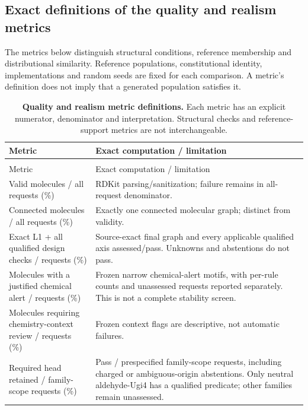 \subsection{Exact definitions of the quality and realism metrics}
\label{app:22-metrics}
The metrics below distinguish structural conditions, reference membership and distributional
similarity. Reference populations, constitutional identity, implementations and random seeds are fixed
for each comparison. A metric's definition does not imply that a generated population satisfies it.

\begingroup\footnotesize\setlength{\tabcolsep}{4pt}\renewcommand{\arraystretch}{1.12}
\begin{longtable}{@{}>{\raggedright\arraybackslash}p{}>{\raggedright\arraybackslash}p{}@{}}
\caption{\textbf{Quality and realism metric definitions.} Each metric has an explicit numerator, denominator and interpretation. Structural checks and reference-support
metrics are not interchangeable.}\label{tab:22-metric-definitions}\\
\toprule Metric & Exact computation / limitation\\\midrule\endfirsthead
\multicolumn{2}{l}{Table~\ref{tab:22-metric-definitions}, continued}\\\toprule
Metric & Exact computation / limitation\\\midrule\endhead
\bottomrule\endfoot
Valid molecules / all requests (\%) & RDKit parsing/sanitization; failure remains in all-request denominator. \\[1.5pt]
Connected molecules / all requests (\%) & Exactly one connected molecular graph; distinct from validity. \\[1.5pt]
Exact L1 + all qualified design checks / requests (\%) & Source-exact final graph and every applicable qualified axis assessed/pass. Unknowns and abstentions do not pass. \\[1.5pt]
Molecules with a justified chemical alert / requests (\%) & Frozen narrow chemical-alert motifs, with per-rule counts and unassessed requests reported separately. This is not a complete stability screen. \\[1.5pt]
Molecules requiring chemistry-context review / requests (\%) & Frozen context flags are descriptive, not automatic failures. \\[1.5pt]
Required head retained / family-scope requests (\%) & Pass / prespecified family-scope requests, including charged or ambiguous-origin abstentions. Only neutral aldehyde-Ugi4 has a qualified predicate; other families remain unassessed. \\[1.5pt]

\end{longtable}
